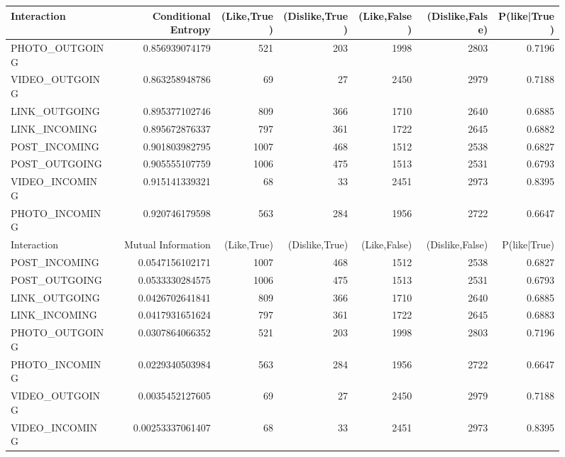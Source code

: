 \documentclass[letterpaper]{article}
\begin{document}
\begin{figure}
\begin{table}
\begin{tabular}{| >{\small}l | >{\small}r | >{\small}r | >{\small}r | >{\small}r | >{\small}r | >{\small}r |}
		Interaction & Conditional Entropy & (Like,True) & (Dislike,True) & (Like,False) & (Dislike,False)  & P(like|True)\\
		\hline
		PHOTO\_OUTGOING & 0.856939074179 & 521 & 203 & 1998 & 2803 & 0.7196\\
		VIDEO\_OUTGOING & 0.863258948786 & 69 & 27 & 2450 & 2979 & 0.7188\\
		LINK\_OUTGOING & 0.895377102746 & 809 & 366 & 1710 & 2640 & 0.6885\\
		LINK\_INCOMING & 0.895672876337 & 797 & 361 & 1722 & 2645 & 0.6882\\
		POST\_INCOMING & 0.901803982795 & 1007 & 468 & 1512 & 2538 & 0.6827\\
		POST\_OUTGOING & 0.905555107759 & 1006 & 475 & 1513 & 2531 & 0.6793\\
		VIDEO\_INCOMING & 0.915141339321 & 68 & 33 & 2451 & 2973 & 0.8395\\
		PHOTO\_INCOMING & 0.920746179598 & 563 & 284 & 1956 & 2722 & 0.6647\\
		\hline
		\hline
		Interaction & Mutual Information & (Like,True) & (Dislike,True) & (Like,False) & (Dislike,False)& P(like|True)\\
		\hline
		POST\_INCOMING & 0.0547156102171 & 1007 & 468 & 1512 & 2538 & 0.6827\\
		POST\_OUTGOING & 0.0533330284575 & 1006 & 475 & 1513 & 2531  & 0.6793\\
		LINK\_OUTGOING & 0.0426702641841 & 809 & 366 & 1710 & 2640 & 0.6885\\
		LINK\_INCOMING & 0.0417931651624 & 797 & 361 & 1722 & 2645 & 0.6883\\
		PHOTO\_OUTGOING & 0.0307864066352 & 521 & 203 & 1998 & 2803 & 0.7196\\
		PHOTO\_INCOMING & 0.0229340503984 & 563 & 284 & 1956 & 2722 & 0.6647\\
		VIDEO\_OUTGOING & 0.0035452127605 & 69 & 27 & 2450 & 2979 & 0.7188\\
		VIDEO\_INCOMING & 0.00253337061407 & 68 & 33 & 2451 & 2973 & 0.8395\\
		\hline
				
	\end{tabular}
\end{table}


\end{figure}
\end{document}
